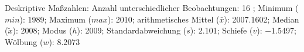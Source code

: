                     \begin{noten}
                	    \note{} Deskriptive Maßzahlen:
                	    Anzahl unterschiedlicher Beobachtungen: 16%
                	    ; 
                	      Minimum ($min$): 1989; 
                	      Maximum ($max$): 2010; 
                	      arithmetisches Mittel ($\bar{x}$): \num[round-mode=places,round-precision=2]{2007.1602}; 
                	      Median ($\tilde{x}$): 2008; 
                	      Modus ($h$): 2009; 
                	      Standardabweichung ($s$): \num[round-mode=places,round-precision=2]{2.101}; 
                	      Schiefe ($v$): \num[round-mode=places,round-precision=2]{-1.5497}; 
                	      Wölbung ($w$): \num[round-mode=places,round-precision=2]{8.2073}
                     \end{noten}

